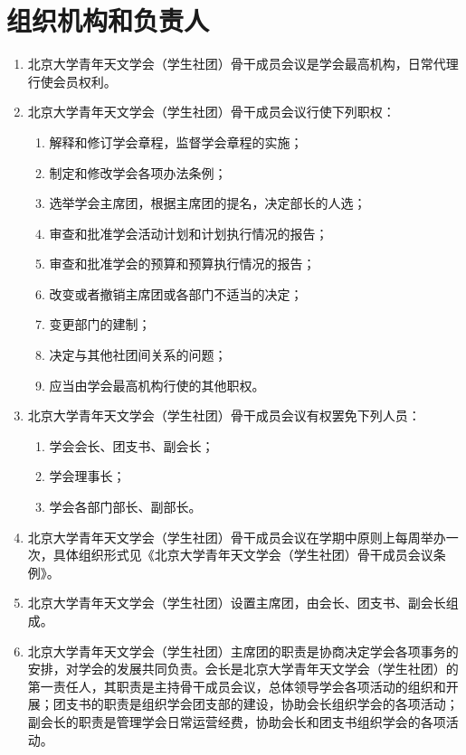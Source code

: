 \section{组织机构和负责人}

\begin{enumerate}[resume]
    \item 北京大学青年天文学会（学生社团）骨干成员会议是学会最高机构，日常代理行使会员权利。
    
    \item 北京大学青年天文学会（学生社团）骨干成员会议行使下列职权：
    
    \begin{enumerate}
        \item 解释和修订学会章程，监督学会章程的实施；
        \item 制定和修改学会各项办法条例；
        \item 选举学会主席团，根据主席团的提名，决定部长的人选；
        \item 审查和批准学会活动计划和计划执行情况的报告；
        \item 审查和批准学会的预算和预算执行情况的报告；
        \item 改变或者撤销主席团或各部门不适当的决定；
        \item 变更部门的建制；
        \item 决定与其他社团间关系的问题；
        \item 应当由学会最高机构行使的其他职权。
    \end{enumerate}
    
    \item 北京大学青年天文学会（学生社团）骨干成员会议有权罢免下列人员：
    
    \begin{enumerate}
        \item 学会会长、团支书、副会长；
        \item 学会理事长；
        \item 学会各部门部长、副部长。
    \end{enumerate}
    
    \item 北京大学青年天文学会（学生社团）骨干成员会议在学期中原则上每周举办一次，具体组织形式见《北京大学青年天文学会（学生社团）骨干成员会议条例》。
    
    \item 北京大学青年天文学会（学生社团）设置主席团，由会长、团支书、副会长组成。
    
    \item 北京大学青年天文学会（学生社团）主席团的职责是协商决定学会各项事务的安排，对学会的发展共同负责。会长是北京大学青年天文学会（学生社团）的第一责任人，其职责是主持骨干成员会议，总体领导学会各项活动的组织和开展；团支书的职责是组织学会团支部的建设，协助会长组织学会的各项活动；副会长的职责是管理学会日常运营经费，协助会长和团支书组织学会的各项活动。
    

\end{enumerate}
